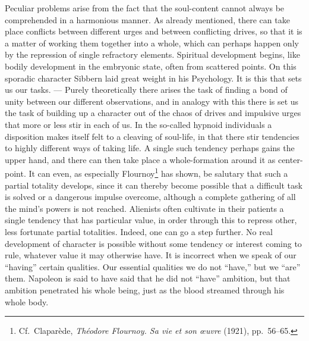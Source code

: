 \documentclass[12pt]{book}
\newcommand{\opage}[1]{\marginnote{\footnotesize\textit{[#1]}}}
\begin{document}
Peculiar problems arise from the fact that the soul-content cannot always be comprehended in a
harmonious manner. As already mentioned, there can take place conflicts between different urges and
between conflicting drives, so that it is a matter of working them together into a whole, which can
perhaps happen only by the repression of single refractory elements. Spiritual development begins,
like bodily development in the embryonic state, often from scattered points. On this sporadic
character Sibbern laid great weight in his Psychology. It is this that sets us our tasks. ---
Purely theoretically there arises the task of finding a bond of unity between our different
observations, and in analogy with this there is set us the task of building up a character out of
the chaos of drives and impulsive urges that more or less stir in each of us. In the so-called
hypnoid individuals \opage{37}a disposition makes itself felt to a cleaving of soul-life, in that there stir
tendencies to highly different ways of taking life. A single such tendency perhaps gains the upper
hand, and there can then take place a whole-formation around it as center-point. It can even, as
especially Flournoy\footnote{Cf.\ Claparède, \textit{Théodore Flournoy. Sa vie et son œuvre} (1921),
pp.\ 56--65.} has shown, be salutary that such a partial totality develops, since it can thereby
become possible that a difficult task is solved or a dangerous impulse overcome, although a complete
gathering of all the mind's powers is not reached. Alienists often cultivate in their patients a
single tendency that has particular value, in order through this to repress other, less fortunate
partial totalities. Indeed, one can go a step further. No real development of character is possible
without some tendency or interest coming to rule, whatever value it may otherwise have. It is
incorrect when we speak of our ``having'' certain qualities. Our essential qualities we do not
``have,'' but we ``are'' them. Napoleon is said to have said that he did not ``have'' ambition, but
that ambition penetrated his whole being, just as the blood streamed through his whole body.
\end{document}
